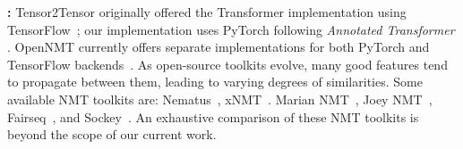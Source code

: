 \textbf{\rtg{}:}
Tensor2Tensor \cite{vaswani-etal-2018-tensor2tensor} originally offered the Transformer \cite{vaswani-2017-attention} implementation using TensorFlow~\cite{tensorflow2015-whitepaper}; 
our implementation uses PyTorch \cite{NEURIPS2019_Pytorch} following \textit{Annotated Transformer} \cite{rush-2018-annotated}.
OpenNMT currently offers separate implementations for both PyTorch and TensorFlow backends~\cite{klein-etal-2017-opennmt,klein-etal-2020-opennmt}.
As open-source toolkits evolve, many good features tend to propagate between them, leading to varying degrees of similarities. Some available NMT toolkits are:
Nematus~\cite{sennrich-etal-2017-nematus}, 
xNMT~\cite{neubig-etal-2018-xnmt}.
Marian NMT~\cite{junczys-dowmunt-etal-2018-marian-fast},
Joey NMT~\cite{kreutzer-etal-2019-joeynmt},
Fairseq~\cite{ott-etal-2019-fairseq}, and 
Sockey~\cite{hieber-etal-2020-sockeye}.
An exhaustive comparison of these NMT toolkits is beyond the scope of our current work.




